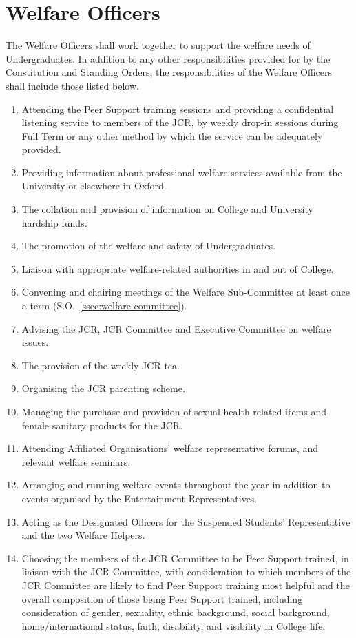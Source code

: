 \section{Welfare Officers}
\npara The Welfare Officers shall work together to support the welfare needs of Undergraduates.
\npara \label{resp:welfare-officers} In addition to any other responsibilities provided for by the Constitution and Standing Orders, the responsibilities of the Welfare Officers shall include those listed below.
\begin{enumerate}
	\item Attending the Peer Support training sessions and providing a confidential listening service to members of the JCR, by weekly drop-in sessions during Full Term or any other method by which the service can be adequately provided.
	\item Providing information about professional welfare services available from the University or elsewhere in Oxford.     
	\item The collation and provision of information on College and University hardship funds.     
	\item The promotion of the welfare and safety of Undergraduates.     
	\item Liaison with appropriate welfare-related authorities in and out of College.     
	\item Convening and chairing meetings of the Welfare Sub-Committee at least once a term (S.O.~\ref{ssec:welfare-committee}).     
	\item Advising the JCR, JCR Committee and Executive Committee on welfare issues.     
	\item The provision of the weekly JCR tea.     
	\item \label{SC:parenting-scheme} Organising the JCR parenting scheme.
	\item Managing the purchase and provision of sexual health related items and female sanitary products for the JCR.
	\item Attending Affiliated Organisations' welfare representative forums, and relevant welfare seminars.
	\item Arranging and running welfare events throughout the year in addition to events organised by the Entertainment Representatives.
	\item Acting as the Designated Officers for the Suspended Students’ Representative and the two Welfare Helpers.
	\item \label{SC:peer-choice} Choosing the members of the JCR Committee to be Peer Support trained, in liaison with the JCR Committee, with consideration to which members of the JCR Committee are likely to find Peer Support training most helpful and the overall composition of those being Peer Support trained, including consideration of gender, sexuality, ethnic background, social background,  home/international status, faith, disability, and visibility in College life.

\end{enumerate}
